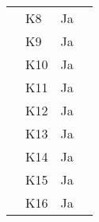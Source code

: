 \documentclass[class=article, crop=false]{standalone}
\begin{document}
\begin{table}[]
\begin{tabular}{llll}
            & K8             & Ja                 &                                                                                                                                                                                                    \\
            & K9             & Ja                 &                                                                                                                                                                                                    \\
            & K10            & Ja                 &                                                                                                                                                                                                    \\
            & K11            & Ja                 &                                                                                                                                                                                                    \\
            & K12            & Ja                 &                                                                                                                                                                                                    \\
            & K13            & Ja                 &                                                                                                                                                                                                    \\
            & K14            & Ja                 &                                                                                                                                                                                                    \\
            & K15            & Ja                 &                                                                                                                                                                                                    \\
            & K16            & Ja                 &                                                                                                                                                                                                    \\

\end{tabular}
\end{table}
\end{document}
